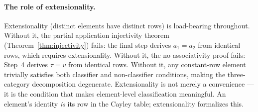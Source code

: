 \documentclass[sigconf,screen,review,anonymous]{acmart}
\theoremstyle{remark}
\begin{document}
\paragraph{The role of extensionality.}
Extensionality (distinct elements have distinct rows) is load-bearing throughout. Without it, the partial application injectivity theorem (Theorem~\ref{thm:injectivity}) fails: the final step derives $a_1 = a_2$ from identical rows, which requires extensionality. Without it, the no-associativity proof fails: Step~4 derives $\tau = v$ from identical rows. Without it, any constant-row element trivially satisfies both classifier and non-classifier conditions, making the three-category decomposition degenerate. Extensionality is not merely a convenience --- it is the condition that makes element-level classification meaningful. An element's identity \emph{is} its row in the Cayley table; extensionality formalizes this.
\end{document}
